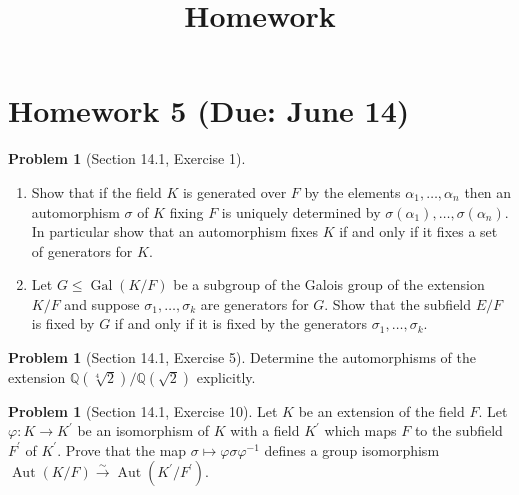 \documentclass{amsart}
\title{Homework}
\numberwithin{equation}{section}
\theoremstyle{definition}
\newtheorem{problem}[thm]{Problem}
\begin{document}


\section*{Homework 5 (Due: June 14)}

\begin{problem}[Section 14.1, Exercise 1]
  \begin{enumerate}
  \item Show that if the field \(K\) is generated over \(F\) by the elements \(\alpha_1, \ldots, \alpha_n\) then an automorphism \(\sigma\) of \(K\) fixing \(F\) is uniquely determined by \(\sigma\left(\alpha_1\right), \ldots, \sigma\left(\alpha_n\right)\). In particular show that an automorphism fixes \(K\) if and only if it fixes a set of generators for \(K\).
\item Let \(G \leq \operatorname{Gal}(K / F)\) be a subgroup of the Galois group of the extension \(K / F\) and suppose \(\sigma_1, \ldots, \sigma_k\) are generators for \(G\). Show that the subfield \(E / F\) is fixed by \(G\) if and only if it is fixed by the generators \(\sigma_1, \ldots, \sigma_k\).
  \end{enumerate}
\end{problem}



\begin{problem}[Section 14.1, Exercise 5]
Determine the automorphisms of the extension \( \mathbb{Q}(\sqrt[4]{2}) / \mathbb{Q}(\sqrt{2})  \) explicitly.
\end{problem}



\begin{problem}[Section 14.1, Exercise 10]
Let \(K\) be an extension of the field \(F\). Let \(\varphi: K \rightarrow K^{\prime}\) be an isomorphism of \(K\) with a field \(K^{\prime}\) which maps \(F\) to the subfield \(F^{\prime}\) of \(K^{\prime}\). Prove that the map \(\sigma \mapsto \varphi \sigma \varphi^{-1}\) defines a group isomorphism \(\operatorname{Aut}(K / F) \xrightarrow{\sim} \operatorname{Aut}\left(K^{\prime} / F^{\prime}\right)\).
\end{problem}
\end{document}
